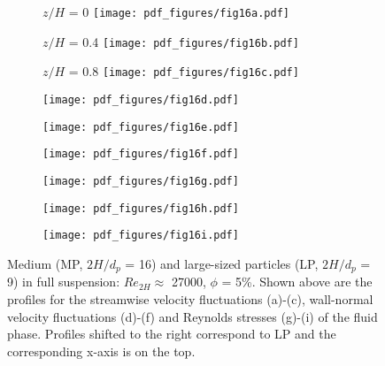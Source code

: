 \documentclass{jfm}
\begin{document}
\begin{figure}
\centering

\begin{subfigure}{.32\textwidth}
  \centering
  $z/H$ = 0
  \texttt{[image: pdf\_figures/fig16a.pdf]}
  \caption{}
  \label{fig:3_6mm_5p_Re27000_sp00mm_urms}
\end{subfigure}%
\begin{subfigure}{.32\textwidth}
  \centering
  $z/H$ = 0.4
  \texttt{[image: pdf\_figures/fig16b.pdf]}
  \caption{}
  \label{fig:3_6mm_5p_Re27000_sp10mm_urms}
\end{subfigure}
\begin{subfigure}{.32\textwidth}
  \centering
  $z/H$ = 0.8
  \texttt{[image: pdf\_figures/fig16c.pdf]}
  \caption{}
  \label{fig:3_6mm_5p_Re27000_sp20mm_urms}
\end{subfigure}

\begin{subfigure}{.32\textwidth}
  \centering
  \texttt{[image: pdf\_figures/fig16d.pdf]}
  \caption{}
  \label{fig:3_6mm_5p_Re27000_sp00mm_vrms}
\end{subfigure}%
\begin{subfigure}{.32\textwidth}
  \centering
  \texttt{[image: pdf\_figures/fig16e.pdf]}
  \caption{}
  \label{fig:3_6mm_5p_Re27000_sp10mm_vrms}
\end{subfigure}
\begin{subfigure}{.32\textwidth}
  \centering
  \texttt{[image: pdf\_figures/fig16f.pdf]}
  \caption{}
  \label{fig:3_6mm_5p_Re27000_sp20mm_vrms}
\end{subfigure}

\begin{subfigure}{.32\textwidth}
  \centering
  \texttt{[image: pdf\_figures/fig16g.pdf]}
  \caption{}
  \label{fig:3_6mm_5p_Re27000_sp00mm_uv}
\end{subfigure}%
\begin{subfigure}{.32\textwidth}
  \centering
  \texttt{[image: pdf\_figures/fig16h.pdf]}
  \caption{}
  \label{fig:3_6mm_5p_Re27000_sp10mm_uv}
\end{subfigure}
\begin{subfigure}{.32\textwidth}
  \centering
  \texttt{[image: pdf\_figures/fig16i.pdf]}
  \caption{}
  \label{fig:3_6mm_5p_Re27000_sp20mm_uv}
\end{subfigure}

\caption{ Medium (MP, $2H/d_p$ = 16) and large-sized particles (LP, $2H/d_p$ = 9) in full suspension: $Re_{2H}\approx$ 27000, $\phi$ = 5\%.  Shown above are the profiles for the streamwise velocity fluctuations (a)-(c), wall-normal velocity fluctuations (d)-(f) and Reynolds stresses (g)-(i) of the fluid phase. Profiles shifted to the right correspond to LP and the corresponding x-axis is on the top.}
\label{fig:3_6mm_5p_Re27000_urms_vrms_uv}
\end{figure}
\end{document}
